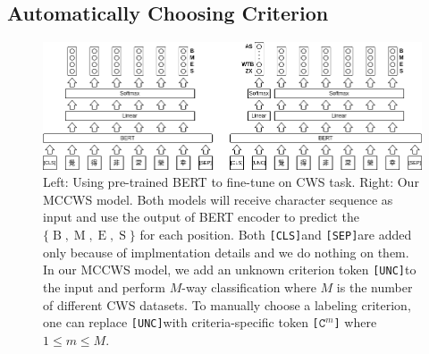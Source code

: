 \documentclass[11pt]{article}
\newcommand{\set}[1]{\lbrace #1 \rbrace}
\newcommand{\CLS}{\texttt{[CLS]}}
\newcommand{\SEP}{\texttt{[SEP]}}
\newcommand{\UNC}{\texttt{[UNC]}}
\newcommand{\Ck}[1]{\texttt{[\(\mathtt{C}^{#1}\)]}}
\newcommand{\BTag}{\operatorname{B}}
\newcommand{\MTag}{\operatorname{M}}
\newcommand{\ETag}{\operatorname{E}}
\newcommand{\STag}{\operatorname{S}}
\newcommand{\TagSet}{\set{\BTag, \MTag, \ETag, \STag}}
\begin{document}
\subsection{Automatically Choosing Criterion}\label{sec:auto}

\begin{figure}[t!]
  \center
  \includegraphics[width=1.95\columnwidth]{./pic3.png}
  \caption{Left: Using pre-trained BERT \citep{devlin-etal-2019-bert} to fine-tune on CWS task.
    Right: Our MCCWS model.
    Both models will receive character sequence as input and use the output of BERT encoder to predict the \(\TagSet\) for each position.
    Both \CLS and \SEP are added only because of implmentation details and we do nothing on them.
    In our MCCWS model, we add an unknown criterion token \UNC to the input and perform \(M\)-way classification where \(M\) is the number of different CWS datasets.
    To manually choose a labeling criterion, one can replace \UNC with criteria-specific token \Ck{m} where \(1 \leq m \leq M\).}
  \label{fig:1}
\end{figure}
\end{document}
